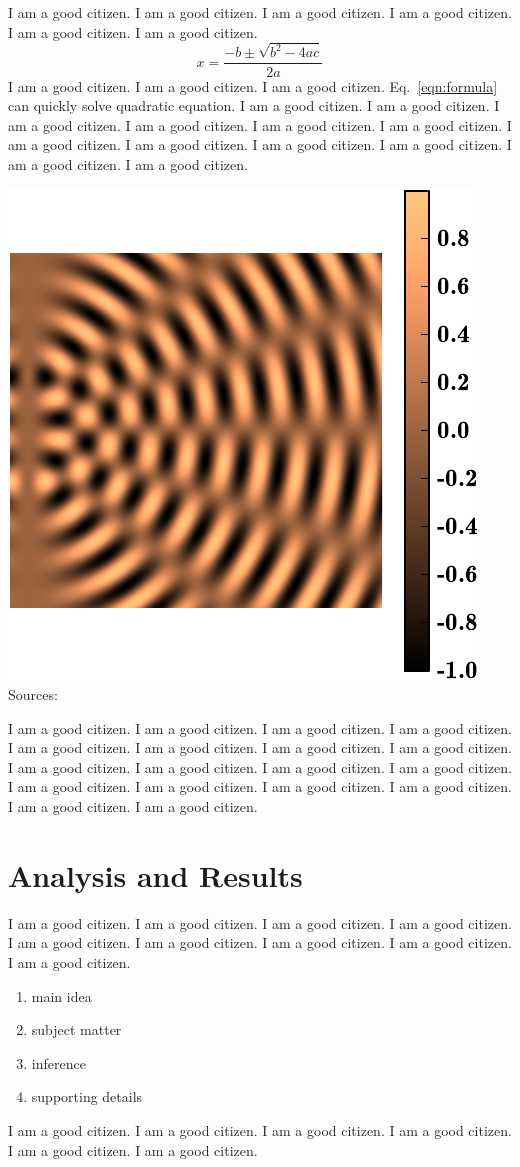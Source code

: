 \documentclass[12pt]{article}
\begin{document}
I am a good citizen. I am a good citizen. I am a good citizen.
I am a good citizen. I am a good citizen. I am a good citizen.
\begin{equation}
x = \dfrac{-b \pm \sqrt{b^2-4ac}}{2a}
\label{eqn:formula}
\end{equation}
I am a good citizen. I am a good citizen. I am a good citizen.
Eq.~\ref{eqn:formula} can quickly solve quadratic equation.
I am a good citizen. I am a good citizen. I am a good citizen.
I am a good citizen. I am a good citizen. I am a good citizen.
I am a good citizen. I am a good citizen. I am a good citizen.
I am a good citizen. I am a good citizen. I am a good citizen.




{\includegraphics[width=.5\linewidth]{watertank}}
{Sources: }

I am a good citizen. I am a good citizen. I am a good citizen.
I am a good citizen. I am a good citizen. I am a good citizen.
I am a good citizen. I am a good citizen. I am a good citizen.
I am a good citizen. I am a good citizen. I am a good citizen.
I am a good citizen. I am a good citizen. I am a good citizen.
I am a good citizen. I am a good citizen. I am a good citizen.

	
\section{Analysis and Results}

I am a good citizen. I am a good citizen. I am a good citizen.
I am a good citizen. I am a good citizen. I am a good citizen.
I am a good citizen. I am a good citizen. I am a good citizen.
\begin{enumerate}
    \item main idea
    \item subject matter
    \item inference
    \item supporting details
\end{enumerate}
I am a good citizen. I am a good citizen. I am a good citizen.
I am a good citizen. I am a good citizen. I am a good citizen.
\end{document}
